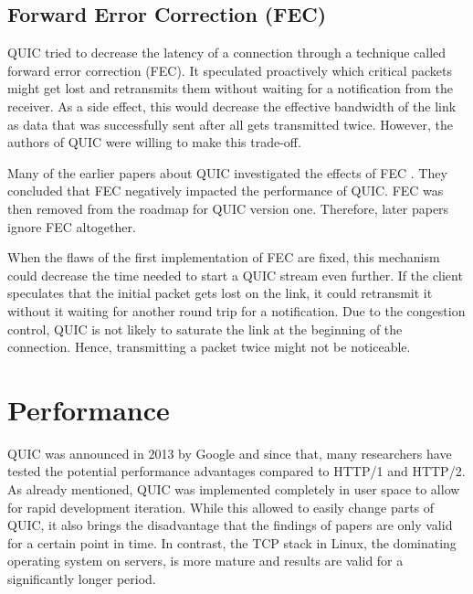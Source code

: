 \documentclass[conference]{IEEEtran}
\begin{document}
% 

\subsection{Forward Error Correction (FEC)}

QUIC tried to decrease the latency of a connection through a technique called forward error correction (FEC). It speculated proactively which critical packets might get lost and retransmits them without waiting for a notification from the receiver. As a side effect, this would decrease the effective bandwidth of the link as data that was successfully sent after all gets transmitted twice. However, the authors of QUIC were willing to make this trade-off. 

Many of the earlier papers about QUIC investigated the effects of FEC \cite{HTTPoverUDP}. They concluded that FEC negatively impacted the performance of QUIC. FEC was then removed from the roadmap for QUIC version one. Therefore, later papers ignore FEC altogether.

When the flaws of the first implementation of FEC are fixed, this mechanism could decrease the time needed to start a QUIC stream even further. If the client speculates that the initial packet gets lost on the link, it could retransmit it without it waiting for another round trip for a notification. Due to the congestion control, QUIC is not likely to saturate the link at the beginning of the connection. Hence, transmitting a packet twice might not be noticeable.


\section{Performance}
\label{sec:Performance}

QUIC was announced in 2013 by Google and since that, many researchers have tested the potential performance advantages compared to HTTP/1 and HTTP/2. As already mentioned, QUIC was implemented completely in user space to allow for rapid development iteration. While this allowed to easily change parts of QUIC, it also brings the disadvantage that the findings of papers are only valid for a certain point in time. In contrast, the TCP stack in Linux, the dominating operating system on servers, is more mature and results are valid for a significantly longer period. 
\end{document}

